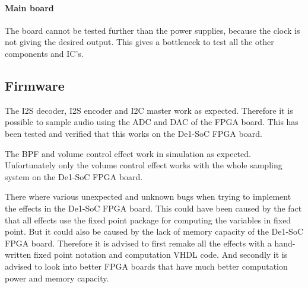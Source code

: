 \paragraph{Main board}
The board cannot be tested further than the power supplies, because the clock is not giving the desired output. This gives a bottleneck to test all the other components and IC's.

\subsection{Firmware}
The I2S decoder, I2S encoder and I2C master work as expected. Therefore it is possible to sample audio using the ADC and DAC of the FPGA board. This has been tested and verified that this works on the De1-SoC FPGA board. 

The BPF and volume control effect work in simulation as expected. Unfortunately only the volume control effect works with the whole sampling system on the De1-SoC FPGA board. 

There where various unexpected and unknown bugs when trying to implement the effects in the De1-SoC FPGA board. This could have been caused by the fact that all effects use the fixed point package for computing the variables in fixed point. But it could also be caused by the lack of memory capacity of the De1-SoC FPGA board. Therefore it is advised to first remake all the effects with a hand-written fixed point notation and computation VHDL code. And secondly it is advised to look into better FPGA boards that have much better computation power and memory capacity.